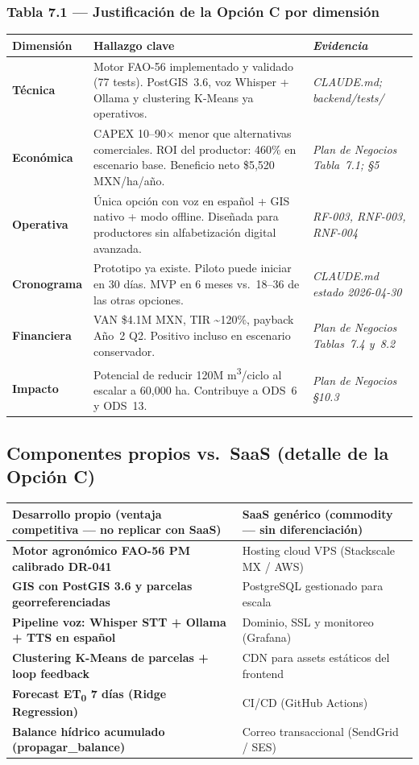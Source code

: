 \documentclass[12pt,letterpaper]{article}
\newcommand{\tH}[1]{\cellcolor{azulOscuro}\color{white}\bfseries\small #1}
\newcommand{\tHm}[1]{\cellcolor{azulMedio}\color{white}\bfseries\small #1}
\newcommand{\fA}{\rowcolor{azulFila}}
\begin{document}
\subsubsection*{Tabla 7.1 — Justificación de la Opción C por dimensión}
\begin{tabularx}{\textwidth}{>{\small\bfseries}p{2.4cm} X >{\small\itshape}p{3.6cm}}
\toprule
\tH{Dimensión} & \tH{Hallazgo clave} & \tH{Evidencia} \\
\midrule
Técnica
  & Motor FAO-56 implementado y validado (77 tests). PostGIS~3.6, voz Whisper + Ollama y clustering K-Means ya operativos.
  & CLAUDE.md; backend/tests/ \\
\fA Económica
  & CAPEX 10–90× menor que alternativas comerciales. ROI del productor: 460\% en escenario base. Beneficio neto \$5{,}520 MXN/ha/año.
  & Plan de Negocios Tabla~7.1; §5 \\
Operativa
  & Única opción con voz en español + GIS nativo + modo offline. Diseñada para productores sin alfabetización digital avanzada.
  & RF-003, RNF-003, RNF-004 \\
\fA Cronograma
  & Prototipo ya existe. Piloto puede iniciar en 30 días. MVP en 6 meses vs.\ 18–36 de las otras opciones.
  & CLAUDE.md estado 2026-04-30 \\
Financiera
  & VAN \$4.1M MXN, TIR \textasciitilde{}120\%, payback Año~2 Q2. Positivo incluso en escenario conservador.
  & Plan de Negocios Tablas~7.4 y~8.2 \\
\fA Impacto
  & Potencial de reducir 120M m\textsuperscript{3}/ciclo al escalar a 60{,}000 ha. Contribuye a ODS~6 y ODS~13.
  & Plan de Negocios §10.3 \\
\bottomrule
\end{tabularx}

\subsection{Componentes propios vs.\ SaaS (detalle de la Opción C)}

\begin{tabularx}{\textwidth}{>{\small\bfseries}X >{\small}X}
\toprule
\tHm{Desarrollo propio (ventaja competitiva — no replicar con SaaS)}
  & \tHm{SaaS genérico (commodity — sin diferenciación)} \\
\midrule
Motor agronómico FAO-56 PM calibrado DR-041     & Hosting cloud VPS (Stackscale MX / AWS) \\
\fA GIS con PostGIS 3.6 y parcelas georreferenciadas & PostgreSQL gestionado para escala \\
Pipeline voz: Whisper STT + Ollama + TTS en español & Dominio, SSL y monitoreo (Grafana) \\
\fA Clustering K-Means de parcelas + loop feedback & CDN para assets estáticos del frontend \\
Forecast ET\textsubscript{0} 7 días (Ridge Regression) & CI/CD (GitHub Actions) \\
\fA Balance hídrico acumulado (propagar\_balance) & Correo transaccional (SendGrid / SES) \\
\bottomrule
\end{tabularx}
\end{document}

